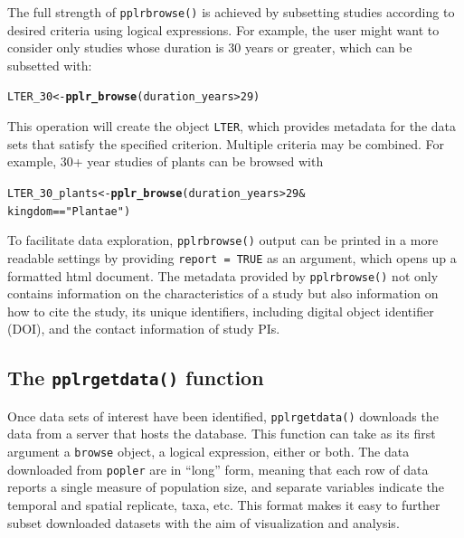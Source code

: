 \documentclass{article}\usepackage[]{graphicx}\usepackage[]{color}
\makeatletter
\newcommand{\hlnum}[1]{\textcolor[rgb]{0.686,0.059,0.569}{#1}}%
\newcommand{\hlstr}[1]{\textcolor[rgb]{0.192,0.494,0.8}{#1}}%
\newcommand{\hlopt}[1]{\textcolor[rgb]{0,0,0}{#1}}%
\newcommand{\hlstd}[1]{\textcolor[rgb]{0.345,0.345,0.345}{#1}}%
\newcommand{\hlkwb}[1]{\textcolor[rgb]{0.69,0.353,0.396}{#1}}%
\newcommand{\hlkwd}[1]{\textcolor[rgb]{0.737,0.353,0.396}{\textbf{#1}}}%
\newenvironment{kframe}{%
 \def\at@end@of@kframe{}%
 \ifinner\ifhmode%
  \def\at@end@of@kframe{\end{minipage}}%
  \begin{minipage}{\columnwidth}%
 \fi\fi%
 \def\FrameCommand##1{\hskip\@totalleftmargin \hskip-\fboxsep
 \colorbox{shadecolor}{##1}\hskip-\fboxsep
     \hskip-\linewidth \hskip-\@totalleftmargin \hskip\columnwidth}%
 \MakeFramed {\advance\hsize-\width
   \@totalleftmargin\z@ \linewidth\hsize
   \@setminipage}}%
 {\par\unskip\endMakeFramed%
 \at@end@of@kframe}
\newenvironment{knitrout}{}{} %
\makeatother
\begin{document}
The full strength of \texttt{pplr\textunderscore browse()} is achieved by subsetting studies according to desired criteria using logical expressions. For example, the user might want to consider only studies whose duration is 30 years or greater, which can be subsetted with:
\begin{knitrout}
\color{fgcolor}\begin{kframe}
\begin{alltt}
\hlstd{LTER_30} \hlkwb{<-} \hlkwd{pplr_browse}\hlstd{( duration_years} \hlopt{>} \hlnum{29}\hlstd{)}
\end{alltt}
\end{kframe}
\end{knitrout}
This operation will create the object \texttt{LTER}, which provides metadata for the data sets that satisfy the specified criterion. Multiple criteria may be combined. For example, 30+ year studies of plants can be browsed with
\begin{knitrout}
\color{fgcolor}\begin{kframe}
\begin{alltt}
\hlstd{LTER_30_plants} \hlkwb{<-} \hlkwd{pplr_browse}\hlstd{( duration_years} \hlopt{>} \hlnum{29} \hlopt{&}
                               \hlstd{kingdom} \hlopt{==} \hlstr{"Plantae"}\hlstd{)}
\end{alltt}
\end{kframe}
\end{knitrout}
To facilitate data exploration, \texttt{pplr\textunderscore browse()} output can be printed in a more readable settings by providing \texttt{report = TRUE} as an argument, which opens up a formatted html document. The metadata provided by \texttt{pplr\textunderscore browse()} not only contains information on the characteristics of a study but also information on how to cite the study, its unique identifiers, including digital object identifier (DOI), and the contact information of study PIs. 

\subsection*{The \texttt{pplr\textunderscore get\textunderscore data()} function}

Once data sets of interest have been identified, \texttt{pplr\textunderscore get\textunderscore data()} downloads the data from a server that hosts the database. This function can take as its first argument a \texttt{browse} object, a logical expression, either or both. The data downloaded from \texttt{popler} are in ``long'' form, meaning that each row of data reports a single measure of population size, and separate variables indicate the temporal and spatial replicate, taxa, etc. This format makes it easy to further subset downloaded datasets with the aim of visualization and analysis. 
\end{document}
